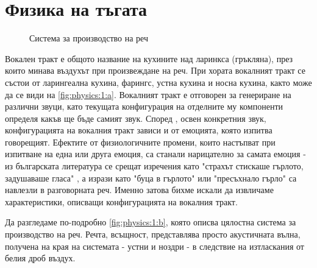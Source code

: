 \documentclass[main.tex]{subfiles}
\begin{document}
\section{Физика на тъгата}
    
    \begin{figure}[ht]%
        \centering
        \begin{changemargin}{0cm}{0cm} 
             \hspace{0.8cm}
        \end{changemargin} 
        \caption{Система за производство на реч}%
        \label{fig:physics:1}
    \end{figure}

    Вокален тракт е общото название на кухините над ларинкса (гръкляна), през които минава въздухът при произвеждане на реч.
    При хората вокалният тракт се състои от ларингеална кухина, фарингс, устна кухина и носна кухина, както може да се види на \autoref{fig:physics:1:a}. Вокалният тракт е отговорен за генериране на различни звуци, като текущата конфигурация на отделните му компоненти определя какъв ще бъде самият звук.
    Според \cite{emotional:shit}, освен конкретния звук, конфигурацията на вокалния тракт зависи и от емоцията, която изпитва говорещият. Ефектите от физиологичните промени,
    които настъпват при изпитване на една или друга емоция, са станали нарицателно за самата емоция - из българската литература се срещат изречения като "страхът стискаше гърлото, задушаваше гласа" \cite{talev}, а 
    изрази като "буца в гърлото" или "пресъхнало гърло" са навлезли в разговорната реч.
    Именно затова бихме искали да извличаме характеристики, описващи конфигурацията на вокалния тракт.

    
    Да разгледаме по-подробно \autoref{fig:physics:1:b}, която описва цялостна система за производство на реч.
    Речта, всъщност, представлява просто акустичната вълна, получена на края на системата - устни и ноздри - в следствие на изтласкания от белия дроб въздух.
\end{document}

